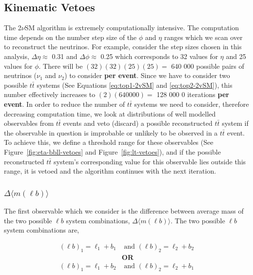 \subsection{Kinematic Vetoes}
The 2$\nu$SM algorithm is extremely computationally intensive. The computation time depends on the number step size of the $\phi$ and $\eta$ ranges which we scan over to reconstruct the neutrinos. For example, consider the step sizes chosen in this analysis, $\Delta \eta \approx$ 0.31 and $\Delta \phi \approx$ 0.25 which corresponds to 32 values for $\eta$ and 25 values for $\phi$. There will be $(32)(32)(25)(25) = $ 640 000 possible pairs of neutrinos ($\nu_{1}$ and $\nu_{2}$) to consider \textbf{per event}. Since we have to consider two possible $t\bar{t}$ systems (See Equations \ref{eq:top1-2vSM} and \ref{eq:top2-2vSM}), this number effectively increases to $(2)(640000) = $ 128 000 0 iterations \textbf{per event}. In order to reduce the number of $t\bar{t}$ systems we need to consider, therefore decreasing computation time, we look at distributions of well modelled observables from $t\bar{t}$ events and veto (discard) a possible reconstructed $t\bar{t}$ system if the observable in question is improbable or unlikely to be observed in a $t\bar{t}$ event. To achieve this, we define a threshold range for these observables (See Figure~\ref{fig:eta-bbll-vetoes} and Figure~\ref{fig:lt-vetoes}), and if the possible reconstructed $t\bar{t}$ system's corresponding value for this observable lies outside this range, it is vetoed and the algorithm continues with the next iteration.

\subsubsection{$\Delta \langle m(\ell b)\rangle$}

The first observable which we consider is the difference between average mass of the two possible $\ell b$ system combinations, $\Delta \langle m(\ell b)\rangle$. The two possible $\ell b$ system combinations are,

\begin{align}
    (\ell b)_{1} = \ell_{1} + b_{1} &\text{ and }  (\ell b)_{2}  = \ell_{2} + b_{2} \\
    &\textbf{OR}\nonumber\\ 
     (\ell b)_{1} = \ell_{1} + b_{2} &\text{ and }  (\ell b)_{2}  = \ell_{2} + b_{1} \\
\end{align}


